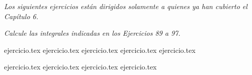 \vspace{1em}
\noindent \textit{Los siguientes ejercicios están dirigidos solamente a quienes ya han cubierto el Capítulo 6.}

\noindent \textit{Calcule las integrales indicadas en los Ejercicios 89 a 97.}

\begin{enumerate}
    \setcounter{enumi}{88}
    \begin{minipage}{0.45\textwidth}
    {ejercicio.tex}
    {ejercicio.tex}
    {ejercicio.tex}
    {ejercicio.tex}
    {ejercicio.tex}
    \end{minipage}%
    \begin{minipage}{0.45\textwidth}
    {ejercicio.tex}
    {ejercicio.tex}
    {ejercicio.tex}
    {ejercicio.tex}
    \end{minipage}
\end{enumerate}
